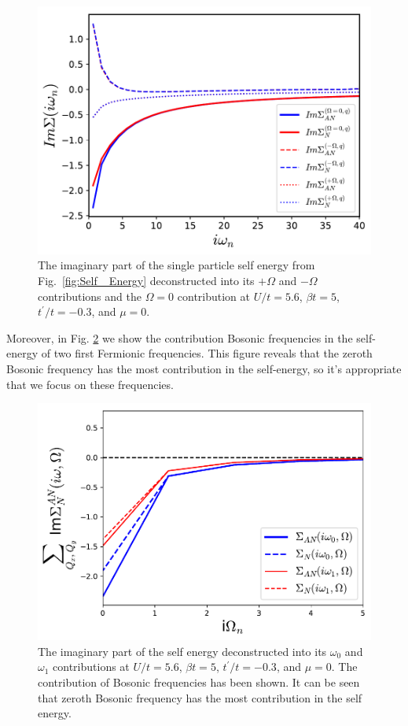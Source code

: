 \begin{figure}[ht]
\centering
    \includegraphics[width=0.9\linewidth]{fig3/self_energy_W0.pdf}
    
\caption{ The imaginary part of the single particle self energy from Fig.~\ref{fig:Self_ Energy} deconstructed into its  $+\Omega$ and $-\Omega$ contributions and the $\Omega=0$ contribution at $U/t=5.6$, $\beta t =5$, $t^\prime /t=-0.3$, and $\mu=0$. \label{fig:sum_frequency0}}
\end{figure}

Moreover, in Fig. \ref{fig:sum_n1} we show the contribution Bosonic frequencies in the self-energy of two first Fermionic frequencies. This figure reveals that the zeroth Bosonic frequency has the most contribution in the self-energy, so it's appropriate that we focus on these frequencies.

\begin{figure}[ht]
\centering
    \includegraphics[width=0.9\linewidth]{fig3/summation_sigma_n1_n2.pdf}
    
\caption{ The imaginary part of the self energy deconstructed into its  $\omega_0$ and $\omega_1$ contributions at $U/t=5.6$, $\beta t =5$, $t^\prime /t=-0.3$, and $\mu=0$. The contribution of Bosonic frequencies has been shown. It can be seen that zeroth Bosonic frequency has the most contribution in the self energy. \label{fig:sum_n1}}
\end{figure}

